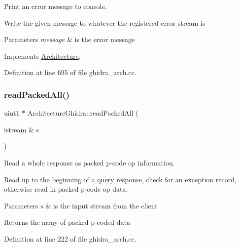 Print an error message to console. 

Write the given message to whatever the registered error stream is 
\begin{DoxyParams}{Parameters}
{\em message} & is the error message \\
\hline
\end{DoxyParams}


Implements \mbox{\hyperlink{class_architecture_a69348906c7601efa002f1f1365decda9}{Architecture}}.



Definition at line 695 of file ghidra\+\_\+arch.\+cc.

\mbox{\label{class_architecture_ghidra_ae2bca9976342b1edd992bf084a028b0b}} 
\subsubsection{\texorpdfstring{readPackedAll()}{readPackedAll()}}
{\footnotesize\ttfamily uint1 $\ast$ Architecture\+Ghidra\+::read\+Packed\+All (\begin{DoxyParamCaption}\item[{istream \&}]{s }\end{DoxyParamCaption})\hspace{0.3cm}{\ttfamily [static]}}



Read a whole response as packed p-\/code op information. 

Read up to the beginning of a query response, check for an exception record, otherwise read in packed p-\/code op data. 
\begin{DoxyParams}{Parameters}
{\em s} & is the input stream from the client \\
\hline
\end{DoxyParams}
\begin{DoxyReturn}{Returns}
the array of packed p-\/coded data 
\end{DoxyReturn}


Definition at line 222 of file ghidra\+\_\+arch.\+cc.

